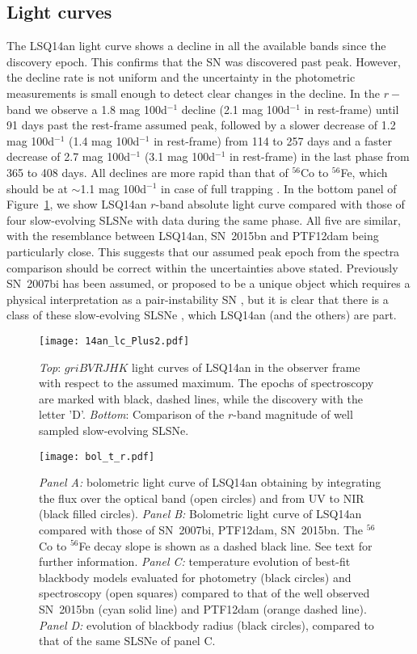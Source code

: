 \documentclass[useAMS,usenatbib]{mn2e}
\def\co{$^{56}$Co}
\def\fe{$^{56}$Fe}
\def\an{LSQ14an}
\begin{document}
\subsection{Light curves}
The \an\/ light curve shows a decline in all the available bands since the discovery epoch. This confirms that the SN was discovered past peak. However, the decline rate is not uniform and the uncertainty in the photometric measurements is small enough to 
detect clear changes in the decline. 
In the $r-$band we observe a 1.8 mag 100d$^{-1}$ decline (2.1 mag 100d$^{-1}$ in rest-frame) until 91 days past the rest-frame assumed peak, followed by a slower decrease of 1.2 mag 100d$^{-1}$ (1.4 mag 100d$^{-1}$ in rest-frame) from 114 to 257 days and a faster decrease of 2.7 mag 100d$^{-1}$ (3.1 mag 100d$^{-1}$ in rest-frame) in the last phase from 365 to 408 days. All declines are more rapid than that of \co\/ to \fe\/, which should be at $\sim$1.1 mag 100d$^{-1}$ in case of full trapping \citep{wb00}. 
In the bottom panel of Figure~\ref{fig:lc}, we show \an\/ $r$-band absolute light curve compared with those of four slow-evolving SLSNe with data during the same phase. All five are similar, with the resemblance between \an\/, SN~2015bn and PTF12dam 
being particularly close. This suggests that our assumed peak epoch from the spectra comparison should be correct within the uncertainties above stated. Previously SN~2007bi has been assumed, or proposed to be a unique object which requires
a physical interpretation as a pair-instability SN \citep{gy09}, but it is clear that there is a class of these slow-evolving SLSNe \citep[as initially proposed by][]{gy12},
which LSQ14an (and the others) are part. 

\begin{figure}
\texttt{[image: 14an\_lc\_Plus2.pdf]}
\caption{{\it Top}: $griBVRJHK$ light curves of \an\/ in the observer frame with respect to the assumed maximum. The epochs of spectroscopy are marked with black, dashed lines, while the discovery with the letter 'D'. {\it Bottom}: Comparison of the $r$-band magnitude of well sampled slow-evolving SLSNe.}
\label{fig:lc}
\end{figure}


\begin{figure}
\texttt{[image: bol\_t\_r.pdf]}
\caption{{\it Panel A:} bolometric light curve of \an\/ obtaining by integrating the flux over the optical band (open circles) and from UV to NIR (black filled circles). {\it Panel B:} Bolometric light curve of \an\/ compared with those of SN~2007bi, PTF12dam, SN~2015bn. The \co\/ to \fe\/ decay slope is shown as a dashed black line. See text for further information. {\it Panel C:} temperature evolution of best-fit blackbody models evaluated for photometry (black circles) and spectroscopy (open squares) compared to that of the well observed SN~2015bn (cyan solid line) and PTF12dam (orange dashed line). {\it Panel D:} evolution of blackbody radius (black circles), compared to that of the same SLSNe of panel C.}
\label{fig:bol}
\end{figure}
\end{document}
